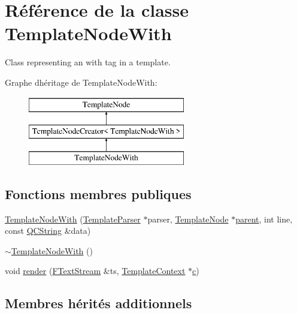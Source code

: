 \hypertarget{class_template_node_with}{}\section{Référence de la classe Template\+Node\+With}
\label{class_template_node_with}


Class representing an \textquotesingle{}with\textquotesingle{} tag in a template.  


Graphe d\textquotesingle{}héritage de Template\+Node\+With\+:\begin{figure}[H]
\begin{center}
\leavevmode
\includegraphics[height=3.000000cm]{class_template_node_with}
\end{center}
\end{figure}
\subsection*{Fonctions membres publiques}
\begin{DoxyCompactItemize}
\item 
\hyperlink{class_template_node_with_afc4fcb9701bd7c780587f80ef43f14b9}{Template\+Node\+With} (\hyperlink{class_template_parser}{Template\+Parser} $\ast$parser, \hyperlink{class_template_node}{Template\+Node} $\ast$\hyperlink{class_template_node_a69a306ef84e62af9fe57bf9aacc94536}{parent}, int line, const \hyperlink{class_q_c_string}{Q\+C\+String} \&data)
\item 
\hyperlink{class_template_node_with_ac68d1a07a595112d971a6f07056d120b}{$\sim$\+Template\+Node\+With} ()
\item 
void \hyperlink{class_template_node_with_ade1b5c7aefb2cc588f96955b6af5ec4d}{render} (\hyperlink{class_f_text_stream}{F\+Text\+Stream} \&ts, \hyperlink{class_template_context}{Template\+Context} $\ast$\hyperlink{060__command__switch_8tcl_ab14f56bc3bd7680490ece4ad7815465f}{c})
\end{DoxyCompactItemize}
\subsection*{Membres hérités additionnels}


